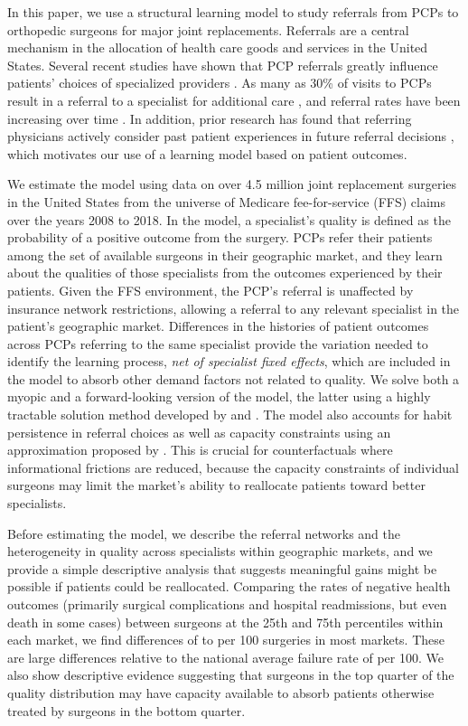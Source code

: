 \documentclass[12pt]{article}
\begin{document}
In this paper, we use a structural learning model to study referrals from PCPs to orthopedic surgeons for major joint replacements. Referrals are a central mechanism in the allocation of health care goods and services in the United States. Several recent studies have shown that PCP referrals greatly influence patients' choices of specialized providers \citep*{freedman2015, gaynor2016, barkowski2018, chernew2021}. As many as 30\% of visits to PCPs result in a referral to a specialist for additional care \citep{wright2022}, and referral rates have been increasing over time \citep{barnett2012aim, mehrotra2011}. In addition, prior research has found that referring physicians actively consider past patient experiences in future referral decisions \citep*{schneider1996, barnett2012gim}, which motivates our use of a learning model based on patient outcomes. 

We estimate the model using data on over 4.5 million joint replacement surgeries in the United States from the universe of Medicare fee-for-service (FFS) claims over the years 2008 to 2018. In the model, a specialist's quality is defined as the probability of a positive outcome from the surgery. PCPs refer their patients among the set of available surgeons in their geographic market, and they learn about the qualities of those specialists from the outcomes experienced by their patients. Given the FFS environment, the PCP's referral is unaffected by insurance network restrictions, allowing a referral to any relevant specialist in the patient's geographic market. Differences in the histories of patient outcomes across PCPs referring to the same specialist provide the variation needed to identify the learning process, \emph{net of specialist fixed effects}, which are included in the model to absorb other demand factors not related to quality. We solve both a myopic and a forward-looking version of the model, the latter using a highly tractable solution method developed by \cite{gittins1979} and \cite{gittins1979bio}. The model also accounts for habit persistence in referral choices as well as capacity constraints using an approximation proposed by \cite*{richards-shubik2021}. This is crucial for counterfactuals where informational frictions are reduced, because the capacity constraints of individual surgeons may limit the market's ability to reallocate patients toward better specialists.

Before estimating the model, we describe the referral networks and the heterogeneity in quality across specialists within geographic markets, and we provide a simple descriptive analysis that suggests meaningful gains might be possible if patients could be reallocated. Comparing the rates of negative health outcomes (primarily surgical complications and hospital readmissions, but even death in some cases) between surgeons at the 25th and 75th percentiles within each market, we find differences of \failureIQRPten{} to \failureIQRPninety{} per 100 surgeries in most markets. These are large differences relative to the national average failure rate of \failureRateMean{} per 100. We also show descriptive evidence suggesting that surgeons in the top quarter of the quality distribution may have capacity available to absorb patients otherwise treated by surgeons in the bottom quarter.
\end{document}
